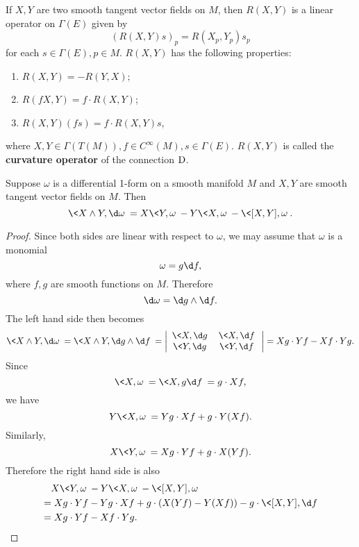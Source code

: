 \documentclass[11pt]{article}
\begin{document}
If $X, Y$ are two smooth tangent vector fields on $M$, then $R(X, Y)$ is a linear operator on $\Gamma(E)$ given by $$(R(X, Y)s)_p = R(X_p, Y_p)s_p$$ for each $s \in \Gamma(E), p \in M$. $R(X, Y)$ has the following properties:
\begin{enumerate}
    \item $R(X, Y) = -R(Y, X)$;
    \item $R(fX, Y) = f \cdot R(X, Y)$;
    \item $R(X, Y)(fs) = f \cdot R(X, Y)s$,
\end{enumerate}
where $X, Y \in \Gamma(T(M)), f \in C^\infty(M), s \in \Gamma(E)$. $R(X, Y)$ is called the \textbf{curvature operator} of the connection $\text{D}$. 

\begin{lemma}\label{lem:wedge}
    Suppose $\omega$ is a differential 1-form on a smooth manifold $M$ and $X, Y$ are smooth tangent vector fields on $M$. Then $$\<X \wedge Y, \d\omega\> = X\<Y, \omega\> - Y\<X, \omega\> - \<[X, Y], \omega\>.$$
\end{lemma}
\begin{proof}
    Since both sides are linear with respect to $\omega$, we may assume that $\omega$ is a monomial $$\omega = g \d f,$$ where $f, g$ are smooth functions on $M$. Therefore $$\d\omega = \d g \wedge \d f.$$ The left hand side then becomes $$\<X \wedge Y, \d\omega\> = \<X \wedge Y, \d g \wedge \d f\> = \left|\begin{array}{c c} \<X, \d g\> & \<X, \d f\> \\ \<Y, \d g\> & \<Y, \d f\> \end{array}\right| = Xg \cdot Yf - Xf \cdot Yg.$$
    Since $$\<X, \omega\> = \<X, g \d f\> = g \cdot Xf,$$ we have $$Y\<X, \omega\> = Yg \cdot Xf + g \cdot Y(Xf).$$ Similarly, $$X\<Y, \omega\> = Xg \cdot Yf + g \cdot X(Yf).$$ Therefore the right hand side is also
    \begin{align*}
        & \quad X\<Y, \omega\> - Y\<X, \omega\> - \<[X, Y], \omega\> \\
        &= Xg \cdot Yf - Yg \cdot Xf + g \cdot (X(Yf) - Y(Xf)) - g \cdot \<[X, Y], \d f\> \\
        &= Xg \cdot Yf - Xf \cdot Yg. 
    \end{align*}
\end{proof}
\end{document}
